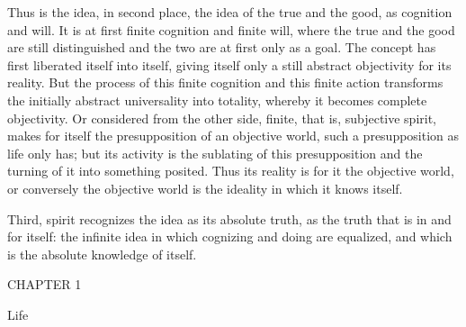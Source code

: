 Thus is the idea, in second place,
the idea of the true and the good,
as cognition and will.
It is at first finite cognition and finite will,
where the true and the good are still distinguished
and the two are at first only as a goal.
The concept has first liberated itself into itself,
giving itself only a still abstract objectivity for its reality.
But the process of this finite cognition and this finite action
transforms the initially abstract universality into totality,
whereby it becomes complete objectivity.
Or considered from the other side,
finite, that is, subjective spirit,
makes for itself the
presupposition of an objective world,
such a presupposition as life only has;
but its activity is the sublating of this presupposition
and the turning of it into something posited.
Thus its reality is for it the objective world,
or conversely the objective world is
the ideality in which it knows itself.

Third, spirit recognizes the idea as its absolute truth,
as the truth that is in and for itself:
the infinite idea in which cognizing and doing are equalized,
and which is the absolute knowledge of itself.

CHAPTER 1

Life

